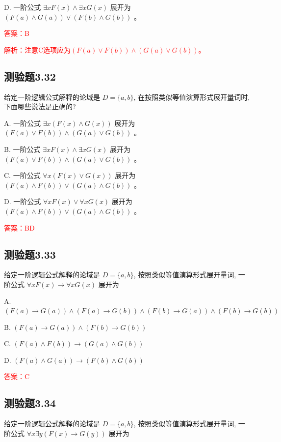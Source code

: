 \documentclass[UTF8, heading=true]{ctexart}
\begin{document}
D. 一阶公式 $\exists x F(x) \wedge \exists x G(x)$ 展开为 $(F(a) \wedge G(a)) \vee(F(b) \wedge G(b))$ 。

\textcolor{red}{答案：B}

\textcolor{red}{解析：注意C选项应为$(F(a) \vee F(b)) \wedge(G(a) \vee G(b))$。}

\subsection{测验题3.32}

给定一阶逻辑公式解释的论域是 $D=\{a, b\}$, 在按照类似等值演算形式展开量词时, 下面哪些说法是正确的?

A. 一阶公式 $\exists x(F(x) \wedge G(x))$ 展开为 $(F(a) \vee F(b)) \wedge(G(a) \vee G(b))$ 。

B. 一阶公式 $\exists x F(x) \wedge \exists x G(x)$ 展开为 $(F(a) \vee F(b)) \wedge(G(a) \vee G(b))$ 。

C. 一阶公式 $\forall x(F(x) \vee G(x))$ 展开为 $(F(a) \wedge F(b)) \vee(G(a) \wedge G(b))$ 。

D. 一阶公式 $\forall x F(x) \vee \forall x G(x)$ 展开为 $(F(a) \wedge F(b)) \vee(G(a) \wedge G(b))$ 。

\textcolor{red}{答案：BD}

\subsection{测验题3.33}

给定一阶逻辑公式解释的论域是 $D=\{a, b\}$, 按照类似等值演算形式展开量词, 一阶公式 $\forall x F(x) \rightarrow \forall x G(x)$ 展开为 $\qquad$

A. $(F(a) \rightarrow G(a)) \wedge(F(a) \rightarrow G(b)) \wedge(F(b) \rightarrow G(a)) \wedge(F(b) \rightarrow G(b))$

B. $(F(a) \rightarrow G(a)) \wedge(F(b) \rightarrow G(b))$

C. $(F(a) \wedge F(b)) \rightarrow(G(a) \wedge G(b))$

D. $(F(a) \wedge G(a)) \rightarrow(F(b) \wedge G(b))$

\textcolor{red}{答案：C}

\subsection{测验题3.34}

给定一阶逻辑公式解释的论域是 $D=\{a, b\}$, 按照类似等值演算形式展开量词, 一阶公式 $\forall x \exists y(F(x) \rightarrow G(y))$ 展开为 $\qquad$
\end{document}
